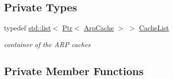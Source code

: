 \subsection*{Private Types}
\begin{DoxyCompactItemize}
\item 
typedef \hyperlink{openflow-interface_8h_afd9bcfa176617760671b67580f536fa7}{std\+::list}$<$ \hyperlink{classns3_1_1Ptr}{Ptr}$<$ \hyperlink{classns3_1_1ArpCache}{Arp\+Cache} $>$ $>$ \hyperlink{classns3_1_1ArpL3Protocol_aae51f1ae2eb4bda375fb2f1fa4cc864a}{Cache\+List}
\begin{DoxyCompactList}\small\item\em container of the A\+RP caches \end{DoxyCompactList}\end{DoxyCompactItemize}
\subsection*{Private Member Functions}
